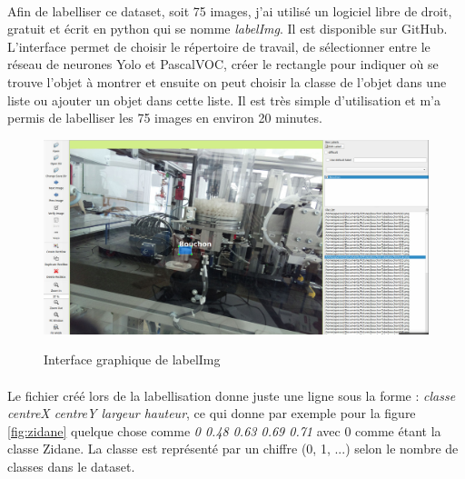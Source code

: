         \paragraph*{}
        Afin de labelliser ce dataset, soit 75 images, j'ai utilisé un logiciel libre de droit, gratuit et écrit en python qui se nomme \textit{labelImg}. Il est disponible sur GitHub\cite{labelImg}. L'interface permet de choisir le répertoire de travail, de sélectionner entre le réseau de neurones Yolo et PascalVOC, créer le rectangle pour indiquer où se trouve l'objet à montrer et ensuite on peut choisir la classe de l'objet dans une liste ou ajouter un objet dans cette liste. Il est très simple d'utilisation et m'a permis de labelliser les 75 images en environ 20 minutes.
        
        \begin{figure}[H]
            \centering
        	\begin{frame}{\includegraphics[width=1\textwidth]{image/uiLabelImg.png}}
        	\end{frame}
        	\caption{\label{fig:uiLabelImg}Interface graphique de labelImg}
        \end{figure}
        
        \paragraph*{}
        Le fichier créé lors de la labellisation donne juste une ligne sous la forme : \textit{classe centreX centreY largeur hauteur}, ce qui donne par exemple pour la figure \ref{fig:zidane} quelque chose comme \textit{0 0.48 0.63 0.69 0.71} avec 0 comme étant la classe Zidane. La classe est représenté par un chiffre (0, 1, ...) selon le nombre de classes dans le dataset.
        
